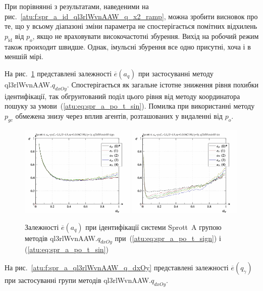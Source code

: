При порівнянні з результатами, наведеними на
рис.~\ref{atu:f:spr_a_id_ql3rlWvnAAW_q_x2_ramp}, можна зробити висновок про те, що у
всьому діапазоні зміни параметра не спостерігається помітних
відхилень
$ p_\mathrm{id} $ від
$ p_o $, якщо не враховувати високочастотні збурення. Вихід на
робочий режим також проиходит швидше. Однак, імульсні збурення
все одно присутні, хоча і в меншій мірі.

На рис.~\ref{atu:f:spr_a_a_q_ql3rlWvnAAW_q_dxOy} представлені залежності
$ \overline{e} (a_q) $ при застосуванні методу
ql3rlWvnAAW.$q_{dxOy}$.
Спостерігається як загальне істотне зниження рівня похибки
ідентифікації, так обгрунтований поділ цього рівня від методу
координатора пошуку за умови~(\ref{atu:eq:spr_a_po_t_sin}). Помилка при
використанні методу
$ p_{gc} $ обмежена знизу через вплив агентів, розташованих у
видаленні від
$ p_o $.

\begin{figure}[htb!]
  \centerline{
    \includegraphics[width=0.49\textwidth]{p/cha/spr_a/ql3rlWvnAAW_dxOy/sprott_a_id2-p_a_q_sign.png}
    \hfill
    \includegraphics[width=0.49\textwidth]{p/cha/spr_a/ql3rlWvnAAW_dxOy/sprott_a_id2-p_a_q_sin.png}
  }
\caption{Залежності $ \overline{e} (a_q) $ при ідентифікації системи Sprott~A групою методів ql3rlWvnAAW.$q_{dxOy} $ при~(\ref{atu:eq:spr_a_po_t_sign}) і (\ref{atu:eq:spr_a_po_t_sin})}
\label{atu:f:spr_a_a_q_ql3rlWvnAAW_q_dxOy}
\end{figure}

На рис.~\ref{atu:f:spr_a_ql3rlWvnAAW_q_dxOy} представлені залежності
$ \overline{e} (q_\gamma) $ при застосуванні групи методів
ql3rlWvnAAW.$q_{dxOy}$.


